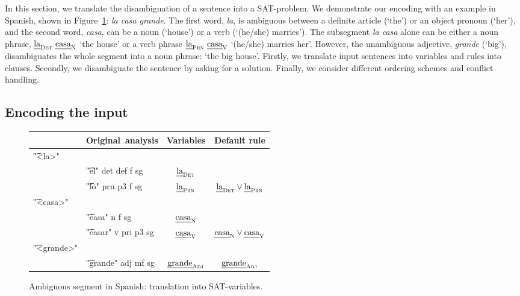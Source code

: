 In this section, we translate the disambiguation of a sentence into a SAT-problem.
We demonstrate our encoding with an example in Spanish, shown in Figure~\ref{fig:laCasaGrande}: {\em la casa grande}. %
The first word, {\em la}, is ambiguous between a definite article (`the') or an object pronoun (`her'), and the second word, {\em casa}, can be a noun (`house') or a verb (`(he/she) marries').
The subsegment {\em la casa} alone can be either a noun phrase, $\text{\em la}_{\text{\sc Det}} \ \text{\em casa}_{\text{\sc N}}$ 
`the house'  or a verb phrase $\text{\em la}_{\text{\sc Prn}} \ \text{\em casa}_{\text{\sc V}}$   `(he/she) marries her'. 
However, the unambiguous adjective, {\em grande} (`big'), disambiguates the whole segment into a noun phrase: `the big house'.
%
Firstly, we translate input sentences into variables and rules into clauses.
Secondly, we disambiguate the sentence by asking for a solution. 
Finally, we consider different ordering schemes and conflict handling.


\subsection{Encoding the input}


\begin{figure}[h]
\centering
\begin{tabular}{p{0.6cm} l | c | c }
   & \textbf{Original~analysis} 
                & \textbf{Variables}
                              & \textbf{Default rule} \\ \hline
\t{"<la>"}   &   &            &  {\small {}} \\
  & \t{"el" 
  det def f sg}  & $\text{\em la}_{\text{\sc Det}}$   &  \\
  & \t{"lo" 
  prn p3 f sg}   & $\text{\em la}_{\text{\sc Prn}}$   &   $\text{\em la}_{\text{\sc Det}} \vee \text{\em la}_{\text{\sc Prn}}$ \\
\t{"<casa>"} &   &            &   \\
  & \t{"casa" 
  n f sg}        & $\text{\em casa}_{\text{\sc N}}$   &  \\
  & \t{"casar"
   v pri p3 sg}  & $\text{\em casa}_{\text{\sc V}}$   & $\text{\em casa}_{\text{\sc N}} \vee \text{\em casa}_{\text{\sc V}}$  \\
\t{"<grande>"} & &            & \\
  & \t{"grande" 
  adj mf sg}   & $\text{\em grande}_{\text{\sc Adj}}$ & $\text{\em grande}_{\text{\sc Adj}}$
\end{tabular}
\caption{Ambiguous segment in Spanish: translation into SAT-variables.}
\label{fig:laCasaGrande}
\end{figure}



